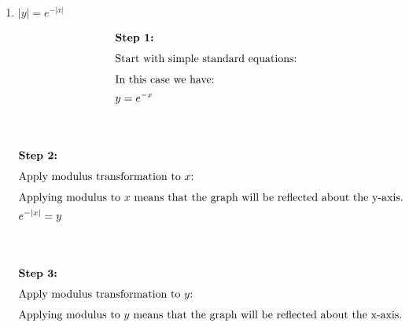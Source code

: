 \begin{enumerate}
\begin{multicols}{2}
        \end{multicols}
\pagebreak
    \item $|y|= e^{-|x|}$
        \begin{multicols}{2}
            \begin{align*}
                \intertext{\textbf{Step 1:}}
                \intertext{Start with simple standard equations:}
                \intertext{In this case we have:}
                y &= e^{-x}\\[10mm]
            \end{align*}
            \begin{center}
            \end{center}
        \end{multicols}
        \begin{multicols}{2}
            \begin{align*}
                \intertext{\textbf{Step 2:}}
                \intertext{Apply modulus transformation to $x$:}
                \intertext{Applying modulus to $x$ means that the graph will be reflected about the y-axis.}
                e^{-|x|} &= y\\[10mm]
            \end{align*}
            \begin{center}
            \end{center}
        \end{multicols}
        \begin{multicols}{2}
            \begin{align*}
                \intertext{\textbf{Step 3:}}
                \intertext{Apply modulus transformation to $y$:}
                \intertext{Applying modulus to $y$ means that the graph will be reflected about the x-axis.}

\end{align*}
\end{multicols}
\end{enumerate}
